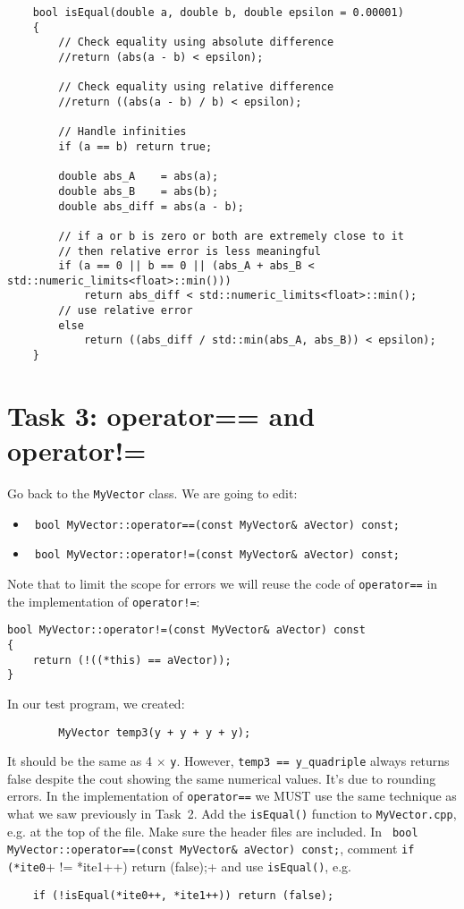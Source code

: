 \documentclass[english,a4paper,12pt,oneside]{article}
\begin{document}
\begin{lstlisting}
    bool isEqual(double a, double b, double epsilon = 0.00001)
    {
        // Check equality using absolute difference
        //return (abs(a - b) < epsilon);

        // Check equality using relative difference
        //return ((abs(a - b) / b) < epsilon);

        // Handle infinities
        if (a == b) return true;
        
        double abs_A    = abs(a);
        double abs_B    = abs(b);
        double abs_diff = abs(a - b);

        // if a or b is zero or both are extremely close to it
        // then relative error is less meaningful
        if (a == 0 || b == 0 || (abs_A + abs_B < std::numeric_limits<float>::min()))
            return abs_diff < std::numeric_limits<float>::min();
        // use relative error
        else
            return ((abs_diff / std::min(abs_A, abs_B)) < epsilon);
    }
\end{lstlisting}





\section{Task 3: operator== and operator!=}

Go back to the \verb+MyVector+ class.
We are going to edit:
\begin{itemize}
\item \verb+ bool MyVector::operator==(const MyVector& aVector) const;+
\item \verb+ bool MyVector::operator!=(const MyVector& aVector) const;+
\end{itemize}

Note that to limit the scope for errors we will reuse the code of \verb+operator==+ in the implementation of \verb+operator!=+:
\begin{lstlisting}
bool MyVector::operator!=(const MyVector& aVector) const
{
	return (!((*this) == aVector));
}
\end{lstlisting}

In our test program, we created:
\begin{lstlisting}
        MyVector temp3(y + y + y + y);
\end{lstlisting}
It should be the same as 4 $\times$ \verb+y+.
However, \verb+temp3 == y_quadriple+ always returns false despite the cout showing the same numerical values. 
It's due to rounding errors.
In the implementation of \verb+operator==+ we MUST use the same technique as what we saw previously in Task~2. 
Add the \verb+isEqual()+ function to \verb+MyVector.cpp+, e.g. at the top of the file. Make sure the header files are included.
In  \verb+ bool MyVector::operator==(const MyVector& aVector) const;+, comment \verb+if (*ite0++ != *ite1++) return (false);+ and use \verb+isEqual()+, e.g.
\begin{lstlisting}
    if (!isEqual(*ite0++, *ite1++)) return (false);
\end{lstlisting}
\end{document}
